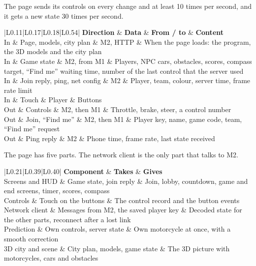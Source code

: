 \documentclass[
  english,
  10pt,
  a4paper,
]{article}
\newcommand{\ckkeep}[1]{\par\noindent\begin{minipage}{\linewidth}\setlength{\parskip}{4pt}#1\end{minipage}\par\smallskip}
\begin{document}
\ckkeep{%
The page sends its controls on every change and at least 10 times per second, and it gets a new state
30 times per second.

\begin{tabular}{|L{0.11}|L{0.17}|L{0.18}|L{0.54}|}
\hline \textbf{Direction} & \textbf{Data} & \textbf{From / to} & \textbf{Content} \\ \hline 
In & Page, models, city plan & M2, HTTP & When the page loads: the program, the 3D models and the city plan \\ \hline
In & Game state & M2, from M1 & Players, NPC cars, obstacles, scores, compass target, ``Find me'' waiting time, number of the last control that the server used \\ \hline
In & Join reply, ping, net config & M2 & Player, team, colour, server time, frame rate limit \\ \hline
In & Touch & Player & Buttons \\ \hline
Out & Controls & M2, then M1 & Throttle, brake, steer, a control number \\ \hline
Out & Join, ``Find me'' & M2, then M1 & Player key, name, game code, team, ``Find me'' request \\ \hline
Out & Ping reply & M2 & Phone time, frame rate, last state received \\ \hline
\end{tabular}}


\ckkeep{%
The page has five parts. The network client is the only part that talks to M2.

\begin{tabular}{|L{0.21}|L{0.39}|L{0.40}|}
\hline \textbf{Component} & \textbf{Takes} & \textbf{Gives} \\ \hline 
Screens and HUD & Game state, join reply & Join, lobby, countdown, game and end screens, timer, scores, compass \\ \hline
Controls & Touch on the buttons & The control record and the button events \\ \hline
Network client & Messages from M2, the saved player key & Decoded state for the other parts, reconnect after a lost link \\ \hline
Prediction & Own controls, server state & Own motorcycle at once, with a smooth correction \\ \hline
3D city and scene & City plan, models, game state & The 3D picture with motorcycles, cars and obstacles \\ \hline
\end{tabular}}
\end{document}
